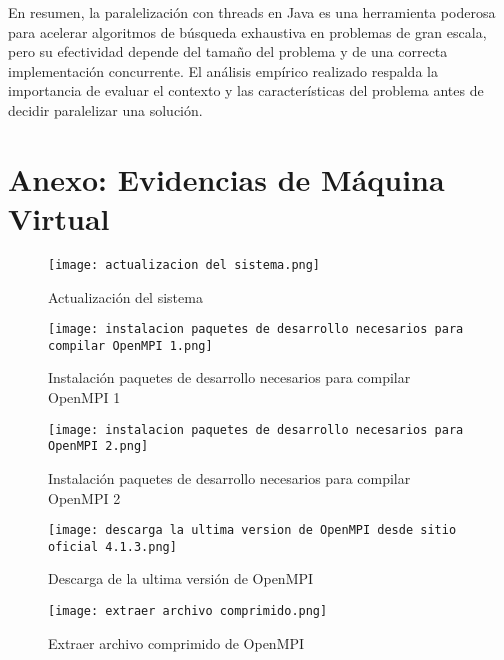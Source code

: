\documentclass[12pt]{article}
\begin{document}
En resumen, la paralelización con threads en Java es una herramienta poderosa para acelerar algoritmos de búsqueda exhaustiva en problemas de gran escala, pero su efectividad depende del tamaño del problema y de una correcta implementación concurrente. El análisis empírico realizado respalda la importancia de evaluar el contexto y las características del problema antes de decidir paralelizar una solución.

\clearpage  %

\section*{Anexo: Evidencias de Máquina Virtual}

\begin{figure}[H]
    \centering
    \texttt{[image: actualizacion del sistema.png]}
    \caption{Actualización del sistema}
    \label{fig:anexo1}
\end{figure}

\begin{figure}[H]
    \centering
    \texttt{[image: instalacion paquetes de desarrollo necesarios para compilar OpenMPI 1.png]}
    \caption{Instalación paquetes de desarrollo necesarios para compilar OpenMPI 1}
    \label{fig:anexo2}
\end{figure}

\begin{figure}[H]
    \centering
    \texttt{[image: instalacion paquetes de desarrollo necesarios para OpenMPI 2.png]}
    \caption{Instalación paquetes de desarrollo necesarios para compilar OpenMPI 2}
    \label{fig:anexo3}
\end{figure}

\begin{figure}[H]
    \centering
    \texttt{[image: descarga la ultima version de OpenMPI desde sitio oficial 4.1.3.png]}
    \caption{Descarga de la ultima versión de OpenMPI}
    \label{fig:anexo4}
\end{figure}

\begin{figure}[H]
    \centering
    \texttt{[image: extraer archivo comprimido.png]}
    \caption{Extraer archivo comprimido de OpenMPI}
    \label{fig:anexo5}
\end{figure}
\end{document}
